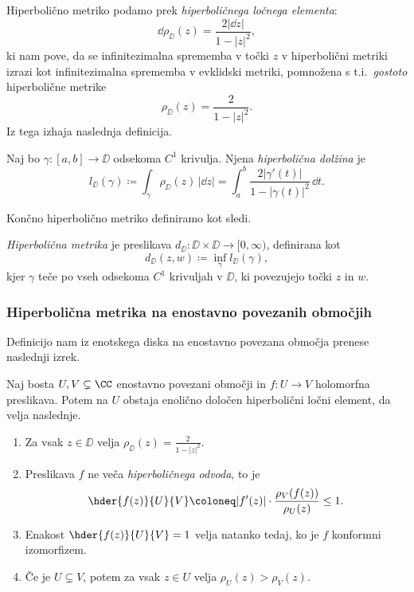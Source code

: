 Hiperbolično metriko podamo prek \emph{hiperboličnega ločnega elementa}:
\[\dd \rho_{\DD} (z) = \frac{2 |\dd z|}{1 - |z|^2},\]
ki nam pove, da se infinitezimalna sprememba v točki \(z\) v hiperbolični metriki izrazi kot infinitezimalna sprememba v evklidski metriki, pomnožena s t.i.~\emph{gostoto} hiperbolične metrike
\[\rho_{\DD} (z) = \frac{2}{1 - |z|^2}.\]
Iz tega izhaja naslednja definicija.

\begin{definicija}
    Naj bo \(\gamma \colon [a, b] \to \DD\) odsekoma \(C^1\) krivulja. Njena \emph{hiperbolična dolžina} je
    \[l_{\DD} (\gamma) \coloneq \int_{\gamma} \rho_{\DD} (z) \, | \dd z | = \int_{a}^{b} \frac{2 | \gamma' (t) | }{1 - | \gamma (t) |^2} \, \dd t.\]
\end{definicija}

\noindent Končno hiperbolično metriko definiramo kot sledi.

\begin{definicija}
    \emph{Hiperbolična metrika} je preslikava \(d_{\DD} \colon \DD \times \DD \to [0, \infty)\), definirana kot
    \[d_{\DD} (z, w) \coloneq \inf_{\gamma} l_{\DD} (\gamma),\]
    kjer \(\gamma\) teče po vseh odsekoma \(C^1\) krivuljah v \(\DD\), ki povezujejo točki \(z\) in \(w\).
\end{definicija}

\subsubsection{Hiperbolična metrika na enostavno povezanih območjih}

Definicijo nam iz enotskega diska na enostavno povezana območja prenese naslednji izrek.

\begin{izrek}[Pick] \label{thm:pick}
    Naj bosta \(U, V \subsetneq \CC\) enostavno povezani območji in \(f \colon U \to V\) holomorfna preslikava. Potem na \(U\) obstaja enolično določen hiperbolični ločni element, da velja naslednje.
    \begin{enumerate}
        \item Za vsak \(z \in \DD\) velja \(\rho_{\DD} (z) = \frac{2}{1 - |z|^2}\).
        \item Preslikava \(f\) ne veča \emph{hiperboličnega odvoda}, to je \[\hder{f (z)}{U}{V} \coloneq |f' (z)| \cdot \frac{\rho_V (f (z))}{\rho_U (z)} \leq 1.\]
        \item Enakost \(\hder{f (z)}{U}{V} = 1\) velja natanko tedaj, ko je \(f\) konformni izomorfizem.
        \item Če je \(U \subsetneq V\), potem za vsak \(z \in U\) velja \(\rho_U (z) > \rho_V (z)\). 
    \end{enumerate}
\end{izrek}

